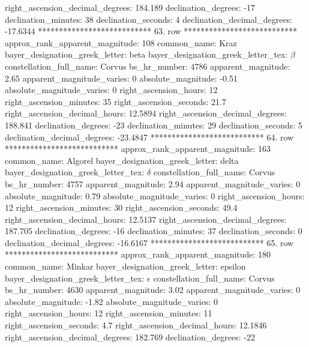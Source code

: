    right_ascension_decimal_degrees: 184.189
               declination_degrees: -17
               declination_minutes: 38
               declination_seconds: 4
       declination_decimal_degrees: -17.6344
*************************** 63. row ***************************
    approx_rank_apparent_magnitude: 108
                       common_name: Kraz
    bayer_designation_greek_letter: beta
bayer_designation_greek_letter_tex: $\beta$
           constellation_full_name: Corvus
                      bs_hr_number: 4786
                apparent_magnitude: 2.65
         apparent_magnitude_varies: 0
                absolute_magnitude: -0.51
         absolute_magnitude_varies: 0
             right_ascension_hours: 12
           right_ascension_minutes: 35
           right_ascension_seconds: 21.7
     right_ascension_decimal_hours: 12.5894
   right_ascension_decimal_degrees: 188.841
               declination_degrees: -23
               declination_minutes: 29
               declination_seconds: 5
       declination_decimal_degrees: -23.4847
*************************** 64. row ***************************
    approx_rank_apparent_magnitude: 163
                       common_name: Algorel
    bayer_designation_greek_letter: delta
bayer_designation_greek_letter_tex: $\delta$
           constellation_full_name: Corvus
                      bs_hr_number: 4757
                apparent_magnitude: 2.94
         apparent_magnitude_varies: 0
                absolute_magnitude: 0.79
         absolute_magnitude_varies: 0
             right_ascension_hours: 12
           right_ascension_minutes: 30
           right_ascension_seconds: 49.4
     right_ascension_decimal_hours: 12.5137
   right_ascension_decimal_degrees: 187.705
               declination_degrees: -16
               declination_minutes: 37
               declination_seconds: 0
       declination_decimal_degrees: -16.6167
*************************** 65. row ***************************
    approx_rank_apparent_magnitude: 180
                       common_name: Minkar
    bayer_designation_greek_letter: epsilon
bayer_designation_greek_letter_tex: $\epsilon$
           constellation_full_name: Corvus
                      bs_hr_number: 4630
                apparent_magnitude: 3.02
         apparent_magnitude_varies: 0
                absolute_magnitude: -1.82
         absolute_magnitude_varies: 0
             right_ascension_hours: 12
           right_ascension_minutes: 11
           right_ascension_seconds: 4.7
     right_ascension_decimal_hours: 12.1846
   right_ascension_decimal_degrees: 182.769
               declination_degrees: -22

